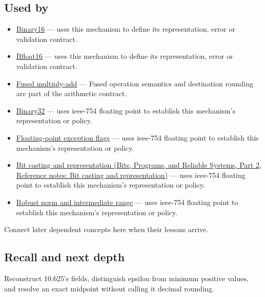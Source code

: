 \subsection{Used by}\label{appendix-343615f49ddf-used-by}

\hypertarget{appendix-343615f49ddf-used-by}{}

\begin{itemize}
\item
  \hyperref[appendix-34443cec7170]{Binary16} --- uses this mechanism to define its representation, error or validation contract.
\item
  \hyperref[appendix-18b8dd966b5d]{Bfloat16} --- uses this mechanism to define its representation, error or validation contract.
\item
  \hyperref[appendix-41e8ef22a21e]{Fused multiply-add} --- Fused operation semantics and destination rounding are part of the arithmetic contract.
\item
  \hyperref[appendix-5057f9ad327f]{Binary32} --- uses ieee-754 floating point to establish this mechanism's representation or policy.
\item
  \hyperref[appendix-ed8531b46754]{Floating-point exception flags} --- uses ieee-754 floating point to establish this mechanism's representation or policy.
\item
  \href{../01-Bits-Programs-and-Reliable-Systems-P02/main.pdf\#nameddest=appendix-34ee45f161c1}{Bit casting and representation (Bits, Programs, and Reliable Systems, Part 2, Reference notes: Bit casting and representation)} --- uses ieee-754 floating point to establish this mechanism's representation or policy.
\item
  \hyperref[appendix-7f1e17dcafb1]{Robust norm and intermediate range} --- uses ieee-754 floating point to establish this mechanism's representation or policy.
\end{itemize}

Connect later dependent concepts here when their lessons arrive.

\subsection{Recall and next depth}\label{appendix-343615f49ddf-recall-and-next-depth}

\hypertarget{appendix-343615f49ddf-recall-and-next-depth}{}

Reconstruct 10.625's fields, distinguish epsilon from minimum positive values, and resolve an exact midpoint without calling it decimal rounding.

